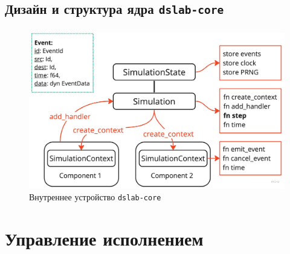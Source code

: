 \documentclass[t]{beamer}  %
\begin{document}
\subsection{Дизайн и структура ядра \texttt{dslab-core}}

	\begin{frame}[fragile]
		\frametitle{\insertsection} 
		\framesubtitle{\insertsubsection}
		\vspace{-10pt}

		\begin{figure}
			\centering
			\includegraphics[width=\linewidth]{images/dslab_overview}
			\caption*{Внутреннее устройство \texttt{dslab-core}}
		\end{figure}
	\end{frame}

 \section{Управление исполнением}
\end{document}
